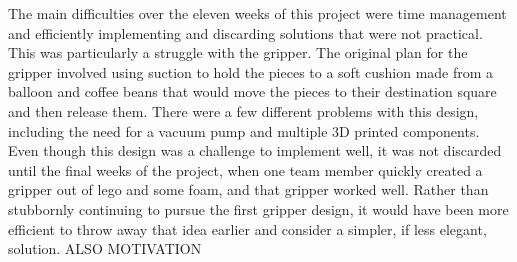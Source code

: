 \documentclass[onecolumn]{IEEEtran}
\begin{document}
The main difficulties over the eleven weeks of this project were time management and efficiently implementing and discarding solutions that were not practical. This was particularly a struggle with the gripper. The original plan for the gripper involved using suction to hold the pieces to a soft cushion made from a balloon and coffee beans that would move the pieces to their destination square and then release them. There were a few different problems with this design, including the need for a vacuum pump and multiple 3D printed components. Even though this design was a challenge to implement well, it was not discarded until the final weeks of the project, when one team member quickly created a gripper out of lego and some foam, and that gripper worked well. Rather than stubbornly continuing to pursue the first gripper design, it would have been more efficient to throw away that idea earlier and consider a simpler, if less elegant, solution. 
ALSO MOTIVATION
\end{document}
